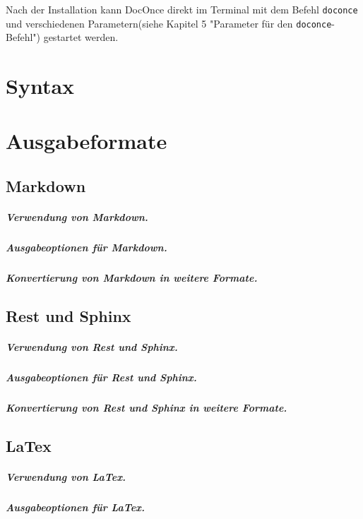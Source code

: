 \documentclass[%
oneside,                 %
final,                   %
chapterprefix=true,      %
open=right,              %
10pt]{book}
\begin{document}
Nach der Installation kann DocOnce direkt im Terminal mit dem Befehl \texttt{doconce} und verschiedenen Parametern(siehe Kapitel 5 "Parameter für den \texttt{doconce}-Befehl") gestartet werden.
\chapter{Syntax}
\chapter{Ausgabeformate}

\section{Markdown}
\paragraph{ Verwendung von Markdown.}
\paragraph{ Ausgabeoptionen für Markdown.}
\paragraph{ Konvertierung von Markdown in weitere Formate.}
\section{Rest und Sphinx}
\paragraph{ Verwendung von Rest und Sphinx.}
\paragraph{ Ausgabeoptionen für Rest und Sphinx.}
\paragraph{ Konvertierung von Rest und Sphinx in weitere Formate.}
\section{LaTex}
\paragraph{ Verwendung von LaTex.}
\paragraph{ Ausgabeoptionen für LaTex.}
\end{document}
